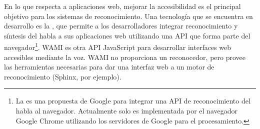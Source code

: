 En lo que respecta a aplicaciones web, mejorar la accesibilidad es el principal objetivo para los sistemas
de reconocimiento. Una tecnolog\'ia que se encuentra en desarrollo es la  \cite{GoogleWebSpeechAPI}, 
que permite a los desarrolladores integrar reconocimiento y s\'intesis del habla a sus aplicaciones web utilizando
una API que forma parte del navegador\footnote{La  es una propuesta de Google para integrar
una API de reconocimiento del habla al navegador. Actualmente solo es implementada por el navegador Google Chrome utilizando
los servidores de Google para el procesamiento.}. WAMI \cite{GruensteinWami2008, WamiHome} es otra API JavaScript
para desarrollar interfaces web accesibles mediante la voz. WAMI no proporciona un reconocedor, pero provee
las herramientas necesarias para dar una interfaz web a un motor de reconocimiento (Sphinx, por ejemplo).
